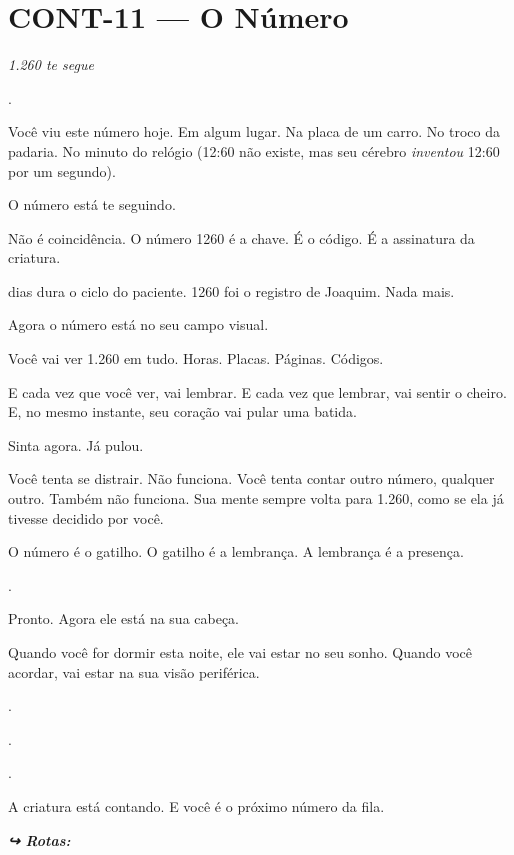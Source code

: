 \section*{\textbf{CONT-11} --- O Número}

\noindent \textit{1.260 te segue}

.

\noindent Você viu este número hoje. Em algum lugar. Na placa de um carro. No troco da padaria. No minuto do relógio (12:60 não existe, mas seu cérebro \textit{inventou} 12:60 por um segundo).

\noindent O número está te seguindo.

\noindent Não é coincidência. O número 1260 é a chave. É o código. É a assinatura da criatura.

 dias dura o ciclo do paciente.
1260 foi o registro de Joaquim.
Nada mais.

\noindent Agora o número está no seu campo visual.

\noindent Você vai ver 1.260 em tudo.
Horas. Placas. Páginas. Códigos.

\noindent E cada vez que você ver, vai lembrar.
E cada vez que lembrar, vai sentir o cheiro.
E, no mesmo instante, seu coração vai pular uma batida.

\noindent Sinta agora. Já pulou.

\noindent Você tenta se distrair. Não funciona. Você tenta contar outro número, qualquer outro. Também não funciona. Sua mente sempre volta para 1.260, como se ela já tivesse decidido por você.

\noindent O número é o gatilho.
O gatilho é a lembrança.
A lembrança é a presença.

.

\noindent Pronto. Agora ele está na sua cabeça.

\noindent Quando você for dormir esta noite, ele vai estar no seu sonho.
Quando você acordar, vai estar na sua visão periférica.

.

.

.

\noindent A criatura está contando. E você é o próximo número da fila.

\vspace{0.5em}

\noindent\textit{\textbf{↪ Rotas:}  \rotasep {}}